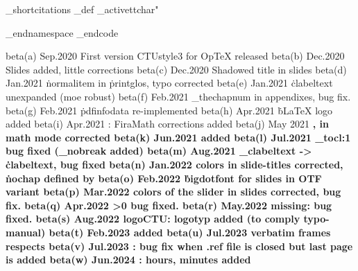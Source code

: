 \_shortcitations
\_def
\_activettchar"

\_endnamespace %
\_endcode


beta(a) Sep.2020  First version CTUstyle3 for OpTeX released
beta(b) Dec.2020  Slides added, little corrections
beta(c) Dec.2020  Shadowed title in slides
beta(d) Jan.2021  \.normalitem in \.printglos, typo corrected
beta(e) Jan.2021  \.clabeltext unexpanded (moe robust)
beta(f) Feb.2021  \_thechapnum in appendixes, bug fix.
beta(g) Feb.2021  \.pdfinfodata re-implemented
beta(h) Apr.2021  \.bLaTeX logo added
beta(i) Apr.2021  \slides: FiraMath corrections added
beta(j) May 2021  \bf, \bi in math mode corrected
beta(k) Jun.2021  \oddchapters added
beta(l) Jul.2021  \_tocl:1 bug fixed (\_nobreak added)
beta(m) Aug.2021  \_clabeltext -> \.clabeltext, bug fixed
beta(n) Jan.2022  colors in slide-titles corrected, \.nochap defined by \eoldef
beta(o) Feb.2022  \.bigdotfont for slides in OTF variant
beta(p) Mar.2022  colors of the slider in slides corrected, bug fix.
beta(q) Apr.2022  \ttline>0 bug fixed.
beta(r) May.2022  \shiftoffset missing: bug fixed.
beta(s) Aug.2022  logoCTU: logotyp added (to comply typo-manual)
beta(t) Feb.2023  \fnumbering added
beta(u) Jul.2023  verbatim frames respects \leftskip
beta(v) Jul.2023  \draft: bug fix when .ref file is closed but last page is added
beta(w) Jun.2024  \draft: hours, minutes added